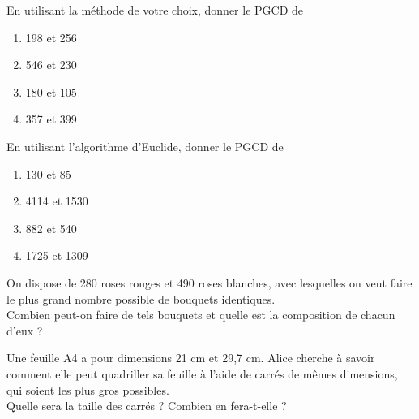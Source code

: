 \documentclass[a4paper,12pt,french]{book}
\begin{document}
\begin{exercice}[]
	
	En utilisant la méthode de votre choix, donner le \textsc{PGCD} de 
	
	\begin{multicols}{4}
		\begin{enumerate}[\bfseries a.]
			\item 198 et 256
			\item 546 et 230
			\item 180 et 105
			\item 357 et 399
		\end{enumerate}
	\end{multicols}
	
\end{exercice}



\begin{exercice}[]
	En utilisant l'algorithme d'Euclide, donner le \textsc{PGCD} de
	
	\begin{multicols}{4}
		\begin{enumerate}[\bfseries a.]
			\item 130 et 85
			\item 4114 et 1530
			\item 882 et 540
			\item 1725 et 1309
		\end{enumerate}
	\end{multicols}
\end{exercice}

\begin{exercice}[]
	On dispose de 280 roses rouges et 490 roses blanches, avec lesquelles on veut faire le plus grand nombre possible de bouquets identiques.\\
	Combien peut-on faire de tels bouquets et quelle est la composition de chacun d'eux ?\\
	
\end{exercice}

\begin{exercice}
	
	Une feuille A4 a pour dimensions 21 cm et 29,7 cm. Alice cherche à savoir comment elle peut quadriller sa feuille à l'aide de carrés de mêmes 
	dimensions, qui soient les plus gros possibles.\\
	Quelle sera la taille des carrés ? Combien en fera-t-elle ?
\end{exercice}
\end{document}
